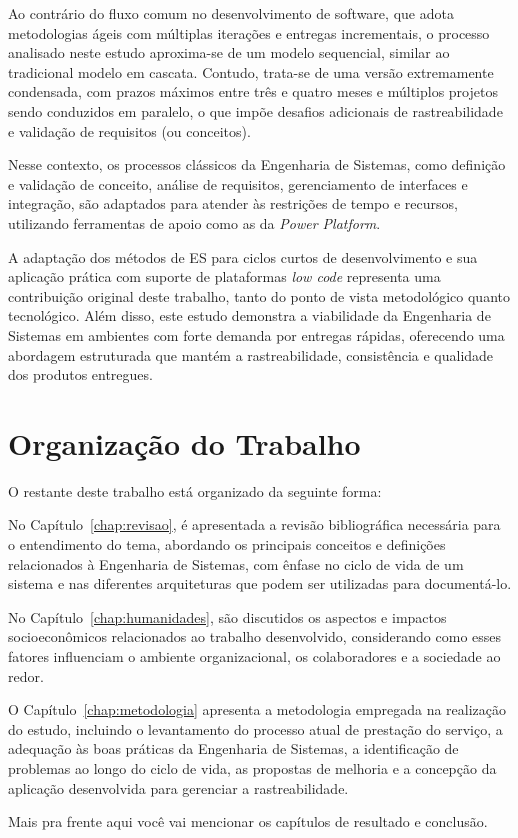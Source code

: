 	Ao contrário do fluxo comum no desenvolvimento de software, que adota metodologias ágeis com múltiplas iterações e entregas incrementais,
	o processo analisado neste estudo aproxima-se de um modelo sequencial, similar ao tradicional modelo em cascata. Contudo, trata-se de uma versão extremamente
	condensada, com prazos máximos entre três e quatro meses e múltiplos projetos sendo conduzidos em paralelo, o que impõe desafios adicionais de rastreabilidade
	e validação de requisitos (ou conceitos).

	Nesse contexto, os processos clássicos da Engenharia de Sistemas, como definição e validação de conceito, análise de requisitos, gerenciamento de interfaces
	e integração, são adaptados para atender às restrições de tempo e recursos, utilizando ferramentas de apoio como as da \textit{Power Platform}.

	A adaptação dos métodos de ES para ciclos curtos de desenvolvimento e sua aplicação prática com suporte de plataformas \textit{low code} representa uma contribuição
	original deste trabalho, tanto do ponto de vista metodológico quanto tecnológico. Além disso, este estudo demonstra a viabilidade da Engenharia de Sistemas em
	ambientes com forte demanda por entregas rápidas, oferecendo uma abordagem estruturada que mantém a rastreabilidade, consistência e qualidade dos produtos entregues.

		
	\section{Organização do Trabalho}\label{sec:introducao:organizacao}

		O restante deste trabalho está organizado da seguinte forma:

		No Capítulo~\ref{chap:revisao}, é apresentada a revisão bibliográfica necessária para o entendimento do tema, abordando os principais conceitos e
		definições relacionados à Engenharia de Sistemas, com ênfase no ciclo de vida de um sistema e nas diferentes arquiteturas que podem ser utilizadas para documentá-lo.

		No Capítulo~\ref{chap:humanidades}, são discutidos os aspectos e impactos socioeconômicos relacionados ao trabalho desenvolvido, considerando como esses fatores
		influenciam o ambiente organizacional, os colaboradores e a sociedade ao redor.

		O Capítulo~\ref{chap:metodologia} apresenta a metodologia empregada na realização do estudo, incluindo o levantamento do processo atual de prestação do serviço,
		a adequação às boas práticas da Engenharia de Sistemas, a identificação de problemas ao longo do ciclo de vida, as propostas de melhoria e a concepção da aplicação
		desenvolvida para gerenciar a rastreabilidade.

		
		{\color{red} Mais pra frente aqui você vai mencionar os capítulos de resultado e conclusão.}
		
